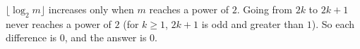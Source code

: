 $\lfloor\log_2m\rfloor$ increases only when $m$ reaches a power of $2$. Going from $2k$ to $2k+1$ never reaches a power of $2$ (for $k\ge1$, $2k+1$ is odd and greater than $1$). So each difference is $0$, and the answer is $\boxed{0}$.
